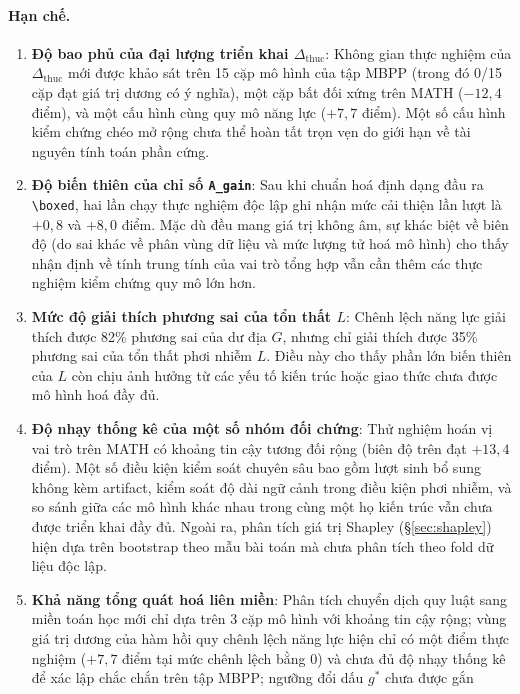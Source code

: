 \documentclass[12pt,a4paper]{article}
\newcommand{\dhonest}{\Delta_{\mathrm{thuc}}}
\begin{document}
\paragraph{Hạn chế.}
\begin{enumerate}\itemsep2pt
\item \textbf{Độ bao phủ của đại lượng triển khai $\dhonest$}: Không gian thực nghiệm của $\dhonest$
      mới được khảo sát trên 15 cặp mô hình của tập MBPP (trong đó 0/15 cặp đạt giá trị dương có ý
      nghĩa), một cặp bất đối xứng trên MATH ($-12{,}4$ điểm), và một cấu hình cùng quy mô năng lực
      ($+7{,}7$ điểm). Một số cấu hình kiểm chứng chéo mở rộng chưa thể hoàn tất trọn vẹn do giới
      hạn về tài nguyên tính toán phần cứng.
\item \textbf{Độ biến thiên của chỉ số \texttt{A\_gain}}: Sau khi chuẩn hoá định dạng đầu ra
      \verb|\boxed|, hai lần chạy thực nghiệm độc lập ghi nhận mức cải thiện lần lượt là $+0{,}8$
      và $+8{,}0$ điểm. Mặc dù đều mang giá trị không âm, sự khác biệt về biên độ (do sai khác về
      phân vùng dữ liệu và mức lượng tử hoá mô hình) cho thấy nhận định về tính trung tính của vai trò
      tổng hợp vẫn cần thêm các thực nghiệm kiểm chứng quy mô lớn hơn.
\item \textbf{Mức độ giải thích phương sai của tổn thất $L$}: Chênh lệch năng lực giải thích được
      82\% phương sai của dư địa $G$, nhưng chỉ giải thích được 35\% phương sai của tổn thất phơi
      nhiễm $L$. Điều này cho thấy phần lớn biến thiên của $L$ còn chịu ảnh hưởng từ các yếu tố kiến
      trúc hoặc giao thức chưa được mô hình hoá đầy đủ.
\item \textbf{Độ nhạy thống kê của một số nhóm đối chứng}: Thử nghiệm hoán vị vai trò trên MATH có
      khoảng tin cậy tương đối rộng (biên độ trên đạt $+13{,}4$ điểm). Một số điều kiện kiểm soát
      chuyên sâu bao gồm lượt sinh bổ sung không kèm artifact, kiểm soát độ dài ngữ cảnh trong
      điều kiện phơi nhiễm, và so sánh giữa các mô hình khác nhau trong cùng một họ kiến trúc vẫn
      chưa được triển khai đầy đủ. Ngoài ra, phân tích giá trị Shapley (\S\ref{sec:shapley}) hiện dựa
      trên bootstrap theo mẫu bài toán mà chưa phân tích theo fold dữ liệu độc lập.
\item \textbf{Khả năng tổng quát hoá liên miền}: Phân tích chuyển dịch quy luật sang miền toán học
      mới chỉ dựa trên 3 cặp mô hình với khoảng tin cậy rộng; vùng giá trị dương của hàm hồi quy chênh
      lệch năng lực hiện chỉ có một điểm thực nghiệm ($+7{,}7$ điểm tại mức chênh lệch bằng 0) và chưa
      đủ độ nhạy thống kê để xác lập chắc chắn trên tập MBPP; ngưỡng đổi dấu $g^\ast$ chưa được gắn

\end{enumerate}
\end{document}
